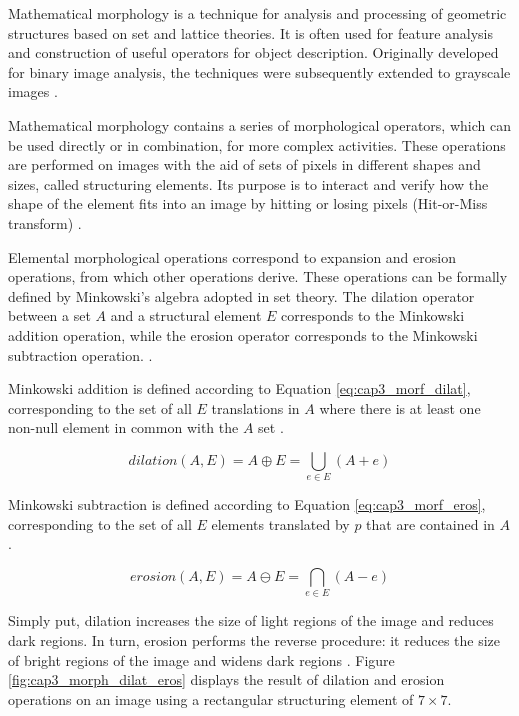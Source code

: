 Mathematical morphology is a technique for analysis and processing of geometric structures based on set and lattice theories.
It is often used for feature analysis and construction of useful operators for object description.
Originally developed for binary image analysis, the techniques were subsequently extended to grayscale images \cite{Serra:2000} \cite{pedrini2008analise}.

Mathematical morphology contains a series of morphological operators, which can be used directly or in combination, for more complex activities.
These operations are performed on images with the aid of sets of pixels in different shapes and sizes, called structuring elements.
Its purpose is to interact and verify how the shape of the element fits into an image by hitting or losing pixels (Hit-or-Miss transform) \cite{Dougherty:1992} \cite{Serra:2000}.

Elemental morphological operations correspond to expansion and erosion operations, from which other operations derive.
These operations can be formally defined by Minkowski's algebra adopted in set theory.
The dilation operator between a set $A$ and a structural element $E$ corresponds to the Minkowski addition operation, while the erosion operator corresponds to the Minkowski subtraction operation. \cite{pedrini2008analise}.

Minkowski addition is defined according to Equation \ref{eq:cap3_morf_dilat}, corresponding to the set of all $E$ translations in $A$ where there is at least one non-null element in common with the $A$ set \cite{pedrini2008analise}.

\begin{equation}
 \textit{dilation}(A,E) = A \oplus E = \bigcup_{e \in E} (A + e)
 \label{eq:cap3_morf_dilat}
\end{equation}

Minkowski subtraction is defined according to Equation \ref{eq:cap3_morf_eros}, corresponding to the set of all $E$ elements translated by $p$ that are contained in $A$ \cite{pedrini2008analise}.

\begin{equation}
 \textit{erosion}(A,E) = A \ominus E = \bigcap_{e \in E} (A - e)
 \label{eq:cap3_morf_eros}
\end{equation}

Simply put, dilation increases the size of light regions of the image and reduces dark regions.
In turn, erosion performs the reverse procedure: it reduces the size of bright regions of the image and widens dark regions \cite[Ch. 9]{HIPR:1996}.
Figure \ref{fig:cap3_morph_dilat_eros} displays the result of dilation and erosion operations on an image using a rectangular structuring element of $7 \times 7$.

